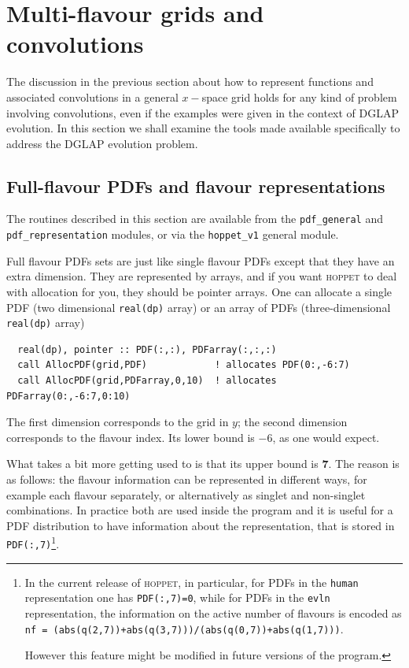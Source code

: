 \documentclass[12pt]{article}
\newcommand{\hoppet}{\textsc{hoppet}\xspace}
\newcommand{\ttt}[1]{\texttt{#1}}
\begin{document}
\section{Multi-flavour grids and convolutions}
\label{sec:dglapstructs}

The discussion in the previous section 
about how to represent functions and associated convolutions
in a general $x-$space grid holds for any kind of problem involving
convolutions, even if the examples were given in the context of DGLAP
evolution. In this section we shall examine the tools made available
specifically to address the DGLAP evolution problem.


\subsection{Full-flavour PDFs and flavour representations}
\label{sec:pdf-objects}

The routines described in this section
 are available from the \ttt{pdf\_general}
and \ttt{pdf\_representation} modules, or via the \ttt{hoppet\_v1}
general module.

Full flavour PDFs sets are just like single flavour PDFs except that they
have an extra dimension. They are represented by arrays, and if you
want \hoppet to deal with allocation for you, they should be pointer
arrays. One can allocate a single PDF (two dimensional
\texttt{real(dp)} array) or an array of PDFs (three-dimensional
\texttt{real(dp)} array)
\begin{lstlisting}
  real(dp), pointer :: PDF(:,:), PDFarray(:,:,:)
  call AllocPDF(grid,PDF)            ! allocates PDF(0:,-6:7)
  call AllocPDF(grid,PDFarray,0,10)  ! allocates PDFarray(0:,-6:7,0:10)
\end{lstlisting}
The first dimension corresponds to the grid in $y$; the second
dimension corresponds to the flavour index. Its lower bound is $-6$,
as one would expect. 

What takes a bit more getting used to is that its
upper bound is \textbf{7}. The reason is as follows: the flavour
information can be represented in different ways, for example each
flavour separately, or alternatively as singlet and non-singlet
combinations. In practice both are used inside the program and it is
useful for a PDF distribution to have information about the
representation, that is stored in
\texttt{PDF(:,7)}\footnote{
In the current release of \hoppet, 
in particular, for PDFs in the \ttt{human} representation one
has \texttt{PDF(:,7)=0}, while for PDFs in the \ttt{evln}
representation, the information on the active number of flavours
is encoded as
\ttt{nf = (abs(q(2,7))+abs(q(3,7)))/(abs(q(0,7))+abs(q(1,7)))}.

However this feature might be modified in future
versions of the program.
}.
\end{document}
